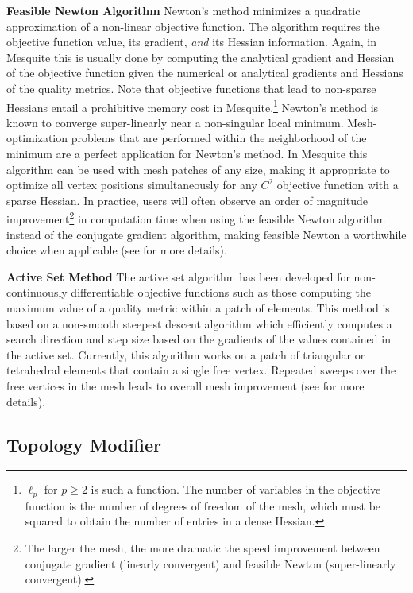 {\bf Feasible Newton Algorithm } \newline
\label{append_feasnewt}
Newton's method minimizes a quadratic
approximation of a non-linear objective function. The algorithm requires
the objective function value, its gradient, \emph{and} its Hessian information.
Again, in Mesquite this
is usually done by computing the analytical gradient and Hessian of
the objective function given the numerical or analytical gradients and
Hessians of the quality metrics.  Note that objective functions that
lead to non-sparse Hessians entail a prohibitive memory cost in
Mesquite.\footnote{$\ell_p$ for $p \geq 2$ is such a function. The
number of variables in the objective function is the number of degrees
of freedom of the mesh, which must be squared to obtain the number of
entries in a dense Hessian.}  Newton's method is known to converge
super-linearly near a non-singular local minimum.   
Mesh-optimization problems that are performed within the neighborhood of
the minimum are a perfect application for Newton's method. In
Mesquite this algorithm can be used with mesh patches of any size,
making it appropriate to optimize all vertex positions simultaneously
for any $C^2$ objective function with a sparse Hessian.  In practice,
users will often observe an order of magnitude improvement\footnote{The larger the mesh, the
more dramatic the speed improvement between conjugate gradient (linearly convergent) and feasible
Newton (super-linearly convergent).} in
computation time when using the feasible Newton algorithm instead of
the conjugate gradient algorithm, making feasible Newton a worthwhile
choice when applicable (see \cite{FeasNewt} for more details). \newline

{\bf Active Set Method } \newline
\label{append_activeset}
The active set algorithm has been
developed for non-continuously differentiable objective functions such
as those computing the maximum value of a quality metric within a
patch of elements. This method is based on a non-smooth steepest
descent algorithm which efficiently computes a search direction and
step size based on the gradients of the values contained in the active
set.  Currently, this algorithm works on a patch of triangular or 
tetrahedral elements that 
contain a single free vertex.  Repeated
sweeps over the free vertices in the mesh leads to overall mesh
improvement (see \cite{fp:ijnme00} for more details).

\subsection{Topology Modifier} \label{sec:TopologyModifier}

